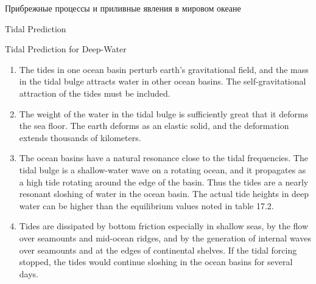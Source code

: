 \begin{chapter}{Прибрежные процессы и приливные явления в мировом океане}
\begin{section}{Tidal Prediction}
\begin{paragraph}{Tidal Prediction for Deep-Water}
\begin{enumerate}
\item 
The tides in one ocean basin perturb earth's gravitational field, and
the mass in the tidal bulge attracts water in other ocean basins. The
self-gravitational attraction of the tides must be included.
%

\item 
The weight of the water in the tidal bulge is sufficiently great that
it deforms the sea floor. The earth deforms as an elastic solid, and
the deformation extends thousands of kilometers.
%

\item 
The ocean basins have a natural resonance close to the tidal
frequencies. The tidal bulge is a shallow-water wave on a rotating
ocean, and it propagates as a high tide rotating around the edge of
the basin. Thus the tides are a nearly resonant sloshing of water in
the ocean basin. The actual tide heights in deep water can be higher
than the equilibrium values noted in table 17.2.
%

\item 
Tides are dissipated by bottom friction especially in shallow seas, by
the flow over seamounts and mid-ocean ridges, and by the generation of
internal waves over seamounts and at the edges of continental
shelves. If the tidal forcing stopped, the tides would continue
sloshing in the ocean basins for several days.
%


\end{enumerate}
\end{paragraph}
\end{section}
\end{chapter}
